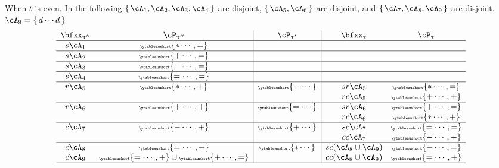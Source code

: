 \documentclass[12pt,a4paper]{amsart}
\numberwithin{equation}{section}
\theoremstyle{remark}
\let\ytb=\ytableaushort
\newcommand{\tytb}[1]{{\tiny\ytb{#1}}}
\def\uptaup{\uptau^{\prime}}
\def\uptaupp{\uptau^{\prime\prime}}
\begin{document}
{When $t$ is even.
In the following
$\set{\cA_{1},\cA_{2}, \cA_{3},\cA_{4}}$ are disjoint, $\set{\cA_{5},\cA_{6}}$ are disjoint,
and $\set{\cA_{7},\cA_{8},\cA_{9}}$ %
are disjoint.
$\cA_{9}=\set{d\cdots d}$
\begin{equation} \label{eq:B1-2}
\begin{array}{cc|c|cc}
  \bfxx_{\uptaupp} & \cP_{\uptaupp}         & \cP_{\uptaup} & \bfxx_{\uptau} & \cP_{\uptau} \\
  \hline
  s\cA_{1}              & \tytb{\ast\cdots ,=} &                                                 \\
  \hline
  s\cA_{2}              & \tytb{+\cdots,=}          &                                                 \\
  \hline
  s\cA_{3}              & \tytb{-\cdots,=}          &                                                 \\
  \hline
  s\cA_{4}              & \tytb{=\cdots,=} &                                                 \\
  \hline
  r\cA_{5}              & \tytb{\ast\cdots,+} & \tytb{-\cdots}  & sr\cA_{5} & \tytb{\ast\cdots, =}                            \\
                        &                    &                & rc\cA_{5} &\tytb{+\cdots,+}                                   \\
  \hline
  r\cA_{6}              & \tytb{+\cdots,+} & \tytb{=\cdots}    & sr\cA_{6} &  \tytb{+\cdots,=}                        \\
                        &                    &                & rc\cA_{6} &\tytb{\ast\cdots,+}                                   \\
  \hline
  c\cA_{7}              & \tytb{-\cdots,+}          & \tytb{+\cdots} & sc\cA_{7} & \tytb{=\cdots,=}                                        \\
                        &                    &                & cc\cA_{7} &\tytb{-\cdots,+}                                   \\
  \hline
  c\cA_{8}              & \tytb{=\cdots,+}          & \tytb{\ast\cdots} & sc(\cA_{8}\cup \cA_{9}) & \tytb{-\cdots,=}                                   \\
   c\cA_{9}           &   \tytb{=\cdots,+}\cup \tytb{+\cdots,=}     &                & cc(\cA_{8}\cup \cA_{9}) &\tytb{=\cdots,+}                                   \\
  \hline

\end{array}
\end{equation}}
\end{document}
